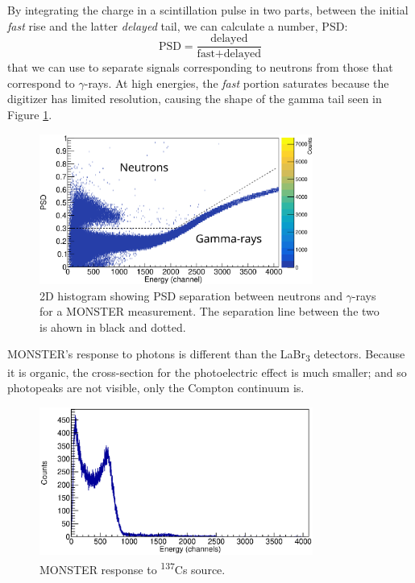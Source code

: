 \documentclass[a4paper,12pt]{report}
\begin{document}
By integrating the charge in a scintillation pulse in two parts, between the initial \textit{fast} rise and the latter \textit{delayed} tail, we can calculate a number, PSD:
\begin{equation}
	\text{PSD} = \frac{\text{delayed}}{\text{fast}+\text{delayed}}
\end{equation}
that we can use to separate signals corresponding to neutrons from those that correspond to $\gamma$-rays.
At high energies, the \textit{fast} portion saturates because the digitizer has limited resolution, causing the shape of the gamma tail seen in Figure \ref{example_psd}.

\begin{figure}[H]
	\centering
	\includegraphics[width=0.80\textwidth]{example_psd.eps}
	\caption{2D histogram showing PSD separation between neutrons and $\gamma$-rays for a MONSTER measurement.
	The separation line between the two is ahown in black and dotted.}
	\label{example_psd}
\end{figure}

MONSTER's response to photons is different than the LaBr\textsubscript{3} detectors.
Because it is organic, the cross-section for the photoelectric effect is much smaller; and so photopeaks are not visible, only the Compton continuum is.

\begin{figure}[H]
	\centering
	\includegraphics[width=0.80\textwidth]{monster_cs_calibration.eps}
	\caption{MONSTER response to \textsuperscript{137}Cs source.}
	\label{monster_cs_calibration}
\end{figure}
\end{document}
